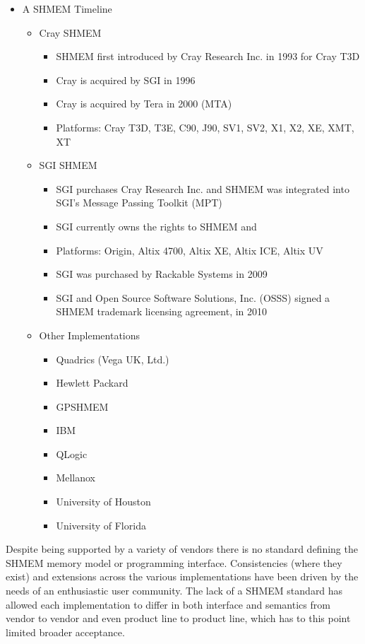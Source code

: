 \begin{itemize}
\item A SHMEM Timeline
  \begin{itemize}
  \item Cray SHMEM
    \begin{itemize}
    \item SHMEM first introduced by Cray Research Inc. in 1993 for Cray T3D
    \item Cray is acquired by SGI in 1996
    \item Cray is acquired by Tera in 2000 (MTA)
    \item Platforms: Cray T3D, T3E, C90, J90, SV1, SV2, X1, X2, XE, XMT, XT
    \end{itemize}
  \item SGI SHMEM
    \begin{itemize}
    \item SGI purchases  Cray Research Inc. and SHMEM was integrated into
      SGI's Message Passing Toolkit (MPT)
    \item SGI currently owns the rights to SHMEM and \openshmem
    \item Platforms: Origin, Altix 4700, Altix XE, Altix ICE, Altix UV
    \item SGI was purchased by Rackable Systems in 2009
    \item SGI and Open Source Software Solutions, Inc. (OSSS) signed a
      SHMEM trademark licensing agreement, in 2010
    \end{itemize}
  \item Other Implementations
    \begin{itemize}
    \item Quadrics (Vega UK, Ltd.)
    \item Hewlett Packard
    \item GPSHMEM
    \item IBM
    \item QLogic
    \item Mellanox
    \item University of Houston
    \item University of Florida
    \end{itemize}
  \end{itemize}
\end{itemize}

Despite being supported by a variety of vendors there is no standard
defining the SHMEM memory model or programming interface. Consistencies
(where they exist) and extensions across the various implementations have
been driven by the needs of an enthusiastic user community. The lack of a
SHMEM standard has allowed each implementation to differ in both interface
and semantics from vendor to vendor and even product line to product line,
which has to this point limited broader acceptance.

